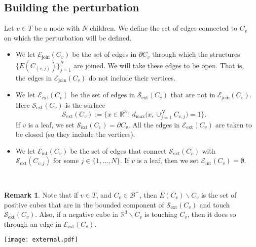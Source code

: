 \documentclass[11pt,reqno]{amsart}
\newcommand{\R}{{\mathbb R}}
\theoremstyle{definition}
\newtheorem{remark}{Remark}
\begin{document}
\subsection{Building the perturbation}\label{S: perturbation}
Let  $v \in T$ be a node with $N$ children. We define the set of edges connected to $C_v$ on which the perturbation will be defined.\smallskip
\begin{itemize}
\item  We let  $\mathcal E_{\text{join}}(C_v)$ be the set of edges  in  $\partial C_v$ through which the structures $\{E( C_{(v,j)})\}_{j=1}^N$ are joined. We will take these edges to be open. That is, the edges in $\mathcal E_{\text{join}}(C_v)$ do not include their vertices.\\
\item We  let
$\mathcal E_{\text{ext}} (C_v)$ be the set of edges in $ \mathcal S_{\text{ext}}(C_v) $ that are not in  $\mathcal E_{\text{join}}(C_v)$. Here $\mathcal S_{\text{ext}} (C_v)$ is the surface
\begin{equation}\label{surface}
 \mathcal S_{\text{ext}} (C_v):=\{ x \in \R^3:\; d_{\text{max}} \big(x,  \cup_{j=1}^NC_{v,j} \big)=1\}.
 \end{equation}  If $v$ is a leaf, we set $\mathcal S_{\text{ext}} (C_v)=\partial C_v$.  All the edges in $\mathcal E_{\text{ext}} (C_v)$ are taken to be closed (so they include the vertices). \\
\item We let  $\mathcal E_{\text{int}}(C_v)$ be the set of edges that connect $ \mathcal S_{\text{ext}} (C_v)$ with $ \mathcal S_{\text{ext}} (C_{v,j})$ for some $j \in \{1, \dots, N\}$. If $v$ is a leaf, then we set $\mathcal E_{\text{int}}(C_v)=\emptyset$.
\end{itemize}\ \smallskip


\begin{remark} Note that if $v \in T$, and $C_v \in \mathcal B^{-}$, then $E(C_v)\backslash C_v$ is the set of positive cubes that are in the bounded component of $ \mathcal S_{\text{ext}} (C_v)$  and touch $\mathcal S_{\text{ext}}(C_v)$.  Also, if a negative cube in $\R^3 \backslash C_v$ is touching $C_v$, then it does so through an edge in $ \mathcal E_{\text{ext}} (C_v)$. \\ \smallskip
\end{remark}

 \begin{center}
\texttt{[image: external.pdf]}
 \end{center}\ \\
\end{document}
